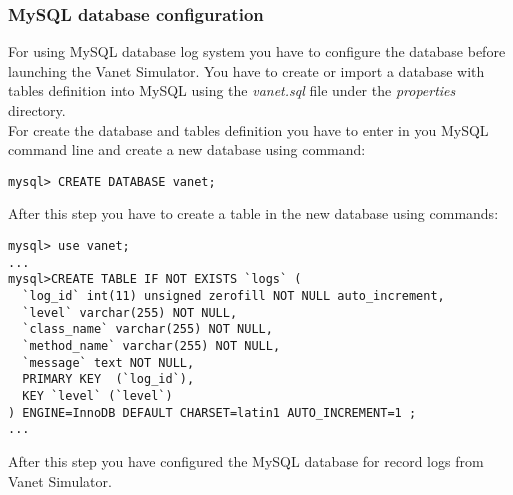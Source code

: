\subsubsection{MySQL database configuration}
For using MySQL database log system you have to configure the database before launching the Vanet Simulator. You have to create or import a database with tables definition into MySQL using the \textit{vanet.sql} file under the \textit{properties} directory.\\
For create the database and tables definition you have to enter in you MySQL command line and create a new database using command:
\begin{verbatim}
mysql> CREATE DATABASE vanet;
\end{verbatim}
After this step you have to create a table in the new database using commands:
\begin{verbatim}
mysql> use vanet;
...
mysql>CREATE TABLE IF NOT EXISTS `logs` (
  `log_id` int(11) unsigned zerofill NOT NULL auto_increment,
  `level` varchar(255) NOT NULL,
  `class_name` varchar(255) NOT NULL,
  `method_name` varchar(255) NOT NULL,
  `message` text NOT NULL,
  PRIMARY KEY  (`log_id`),
  KEY `level` (`level`)
) ENGINE=InnoDB DEFAULT CHARSET=latin1 AUTO_INCREMENT=1 ;
...
\end{verbatim}
After this step you have configured the MySQL database for record logs from Vanet Simulator.
